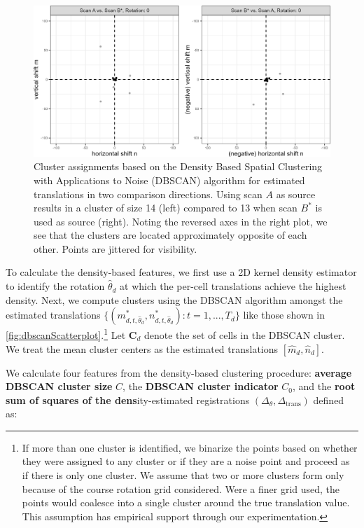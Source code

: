 \documentclass[reprint]{JASA}
\begin{document}
\begin{figure}[htbp]
\includegraphics[width=.5\textwidth]{figures/dbscanScatterplot} \caption{\label{fig:dbscanScatterplot} Cluster assignments based on the Density Based Spatial Clustering with Applications to Noise (DBSCAN) algorithm for estimated translations in two comparison directions. Using scan $A$ as source results in a cluster of size 14 (left) compared to 13 when scan $B^*$ is used as source (right). Noting the reversed axes in the right plot, we see that the clusters are located approximately opposite of each other. Points are jittered for visibility.}\label{fig:unnamed-chunk-7}
\end{figure}

To calculate the density-based features, we first use a 2D kernel
density estimator \citep{MASS} to identify the rotation
\(\hat{\theta}_d\) at which the per-cell translations achieve the
highest density. Next, we compute clusters using the DBSCAN algorithm
amongst the estimated translations
\(\{(m^*_{d,t,\hat{\theta}_d},n^*_{d,t,\hat{\theta}_d}) : t = 1,...,T_d\}\)
like those shown in \autoref{fig:dbscanScatterplot}.\footnote{If more
  than one cluster is identified, we binarize the points based on
  whether they were assigned to any cluster or if they are a noise point
  and proceed as if there is only one cluster. We assume that two or
  more clusters form only because of the course rotation grid
  considered. Were a finer grid used, the points would coalesce into a
  single cluster around the true translation value. This assumption has
  empirical support through our experimentation.} Let \(\pmb{C}_d\)
denote the set of cells in the DBSCAN cluster. We treat the mean cluster
centers as the estimated translations \([\hat{m}_d,\hat{n}_d]\).

We calculate four features from the density-based clustering procedure:
\textbf{average DBSCAN cluster size} \(C\), the \textbf{DBSCAN cluster
indicator} \(C_0\), and the \textbf{root sum of squares of the
dens}ity-estimated registrations
\((\Delta_\theta, \Delta_{\text{trans}})\) defined as:
\end{document}
